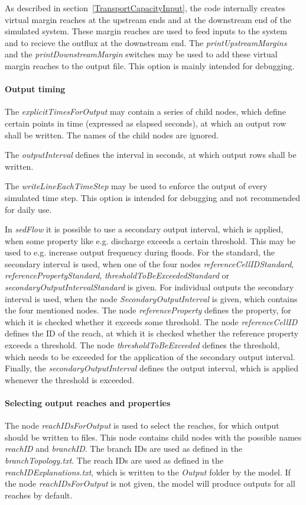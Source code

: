 \documentclass[11pt,a4paper]{article}
\begin{document}
As described in section~\ref{TransportCapacityInput}, the code internally creates virtual margin reaches at the upstream ends and at the downstream end of the simulated system. These margin reaches are used to feed inputs to the system and to recieve the outflux at the downstream end. The \emph{printUpstreamMargins} and the \emph{printDownstreamMargin} switches may be used to add these virtual margin reaches to the output file. This option is mainly intended for debugging.

\paragraph{Output timing}
The \emph{explicitTimesForOutput} may contain a series of child nodes, which define certain points in time (expressed as elapsed seconds), at which an output row shall be written. The names of the child nodes are ignored.

The \emph{outputInterval} defines the interval in seconds, at which output rows shall be written.

The \emph{writeLineEachTimeStep} may be used to enforce the output of every simulated time step. This option is intended for debugging and not recommended for daily use.

In \emph{sedFlow} it is possible to use a secondary output interval, which is applied, when some property like e.g. discharge exceeds a certain threshold. This may be used to e.g. increase output frequency during floods. For the standard, the secondary interval is used, when one of the four nodes \emph{referenceCellIDStandard}, \emph{referencePropertyStandard}, \emph{thresholdToBeExceededStandard} or \emph{secondaryOutputIntervalStandard} is given. For individual outputs the secondary interval is used, when the node \emph{SecondaryOutputInterval} is given, which contains the four mentioned nodes. The node \emph{referenceProperty} defines the property, for which it is checked whether it exceeds some threshold. The node \emph{referenceCellID} defines the ID of the reach, at which it is checked whether the reference property exceeds a threshold. The node \emph{thresholdToBeExceeded} defines the threshold, which needs to be exceeded for the application of the secondary output interval. Finally, the \emph{secondaryOutputInterval} defines the output interval, which is applied whenever the threshold is exceeded.

\paragraph{Selecting output reaches and properties}
The node \emph{reachIDsForOutput} is used to select the reaches, for which output should be written to files. This node contains child nodes with the possible names \emph{reachID} and \emph{branchID}. The branch IDs are used as defined in the \emph{branchTopology.txt}. The reach IDs are used as defined in the \emph{reachIDExplanations.txt}, which is written to the \emph{Output} folder by the model. If the node \emph{reachIDsForOutput} is not given, the model will produce outputs for all reaches by default.
\end{document}
